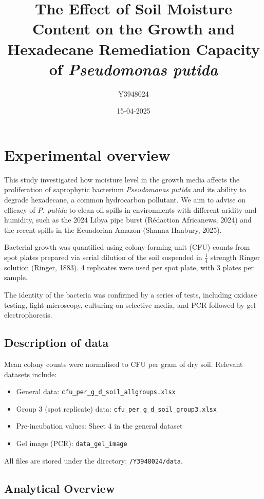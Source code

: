 \documentclass[
]{article}
\title{The Effect of Soil Moisture Content on the Growth and Hexadecane
Remediation Capacity of \emph{Pseudomonas putida}}
\author{Y3948024}
\date{15-04-2025}
\providecommand{\tightlist}{%
  \setlength{\itemsep}{0pt}\setlength{\parskip}{0pt}}
\begin{document}
\maketitle

\section{Experimental overview}\label{experimental-overview}

This study investigated how moisture level in the growth media affects
the proliferation of saprophytic bacterium \emph{Pseudomonas putida} and
its ability to degrade hexadecane, a common hydrocarbon pollutant. We
aim to advise on efficacy of \emph{P. putida} to clean oil spills in
environments with different aridity and humidity, such as the 2024 Libya
pipe burst (Rédaction Africanews, 2024) and the recent spills in the
Ecuadorian Amazon (Shanna Hanbury, 2025).

Bacterial growth was quantified using colony-forming unit (CFU) counts
from spot plates prepared via serial dilution of the soil suspended in
\(\frac{1}{4}\) strength Ringer solution (Ringer, 1883). 4 replicates
were used per spot plate, with 3 plates per sample.

The identity of the bacteria was confirmed by a series of tests,
including oxidase testing, light microscopy, culturing on selective
media, and PCR followed by gel electrophoresis.

\subsection{Description of data}\label{description-of-data}

Mean colony counts were normalised to CFU per gram of dry soil. Relevant
datasets include:

\begin{itemize}
\tightlist
\item
  General data: \texttt{cfu\_per\_g\_d\_soil\_allgroups.xlsx}
\item
  Group 3 (spot replicate) data:
  \texttt{cfu\_per\_g\_d\_soil\_group3.xlsx}
\item
  Pre-incubation values: Sheet 4 in the general dataset
\item
  Gel image (PCR): \texttt{data\_gel\_image}
\end{itemize}

All files are stored under the directory: \texttt{/Y3948024/data}.

\subsection{Analytical Overview}\label{analytical-overview}
\end{document}
